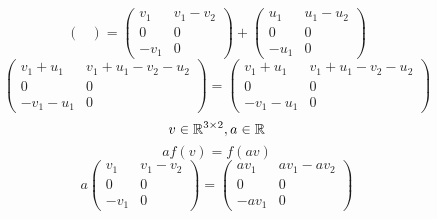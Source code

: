 \documentclass[../practica.root.tex]{subfiles}
\begin{document}
\begin{enumerate}
\begin{enumerate}
\[\begin{pmatrix}
                        \end{pmatrix}
                        =
                        \begin{pmatrix}
                            v_1  & v_1 - v_2 \\
                            0    & 0         \\
                            -v_1 & 0
                        \end{pmatrix}
                        +
                        \begin{pmatrix}
                            u_1  & u_1 - u_2 \\
                            0    & 0         \\
                            -u_1 & 0
                        \end{pmatrix}
                    \] \[
                        \begin{pmatrix}
                            v_1 + u_1  & v_1 + u_1 - v_2 - u_2 \\
                            0          & 0                     \\
                            -v_1 - u_1 & 0
                        \end{pmatrix}
                        =
                        \begin{pmatrix}
                            v_1 + u_1 & v_1 + u_1 - v_2 - u_2 \\
                            0         & 0                     \\
                            -v_1-u_1  & 0
                        \end{pmatrix}
                    \]
                    \[ v \in \mathbb{R}^{3\times2}, a \in \mathbb{R} \]
                    \[ af(v) = f(av) \]
                    \[
                        a
                        \begin{pmatrix}
                            v_1  & v_1 - v_2 \\
                            0    & 0         \\
                            -v_1 & 0
                        \end{pmatrix}
                        =
                        \begin{pmatrix}
                            av_1  & av_1 - av_2 \\
                            0     & 0           \\
                            -av_1 & 0

\end{pmatrix}\]
\end{enumerate}
\end{enumerate}
\end{document}

